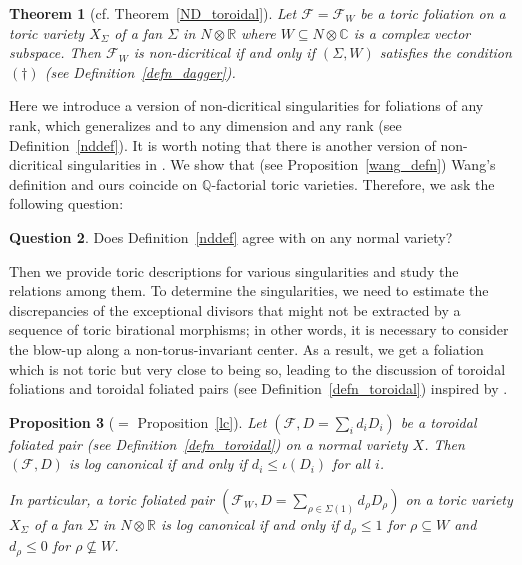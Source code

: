 \documentclass[12pt,reqno]{amsart}
\newtheorem{theorem}{Theorem}[section]
\newtheorem{proposition}[theorem]{Proposition}
\theoremstyle{definition}
\newtheorem{question}[theorem]{Question}
\newcommand{\mb}{\mathbb}
\newcommand\cF{{\mathcal{F}}}
\newcommand\bC{{\mathbb C}}
\newcommand\bR{{\mathbb R}}
\begin{document}
\begin{theorem}[{cf. Theorem~\ref{ND_toroidal}}]
    Let $\cF=\cF_W$ be a toric foliation on a toric variety $X_\Sigma$ of a fan $\Sigma$ in $N\otimes\bR$ where $W\subseteq N\otimes\bC$ is a complex vector subspace. 
    Then $\cF_W$ is non-dicritical if and only if $(\Sigma,W)$ satisfies the condition $(\dagger)$ (see Definition~\ref{defn_dagger}). 
\end{theorem}

Here we introduce a version of non-dicritical singularities for foliations of any rank, which generalizes \cite[Definition 2.10]{CS} and \cite[paragraph before Lemma 2.6]{cascini2025mmp} to any dimension and any rank (see Definition~\ref{nddef}).
It is worth noting that there is another version of non-dicritical singularities in \cite[Definition 3.6]{wang2023toric}. 
We show that (see Proposition~\ref{wang_defn}) Wang's definition and ours coincide on $\mb Q$-factorial toric varieties.
Therefore, we ask the following question:

\begin{question}
    Does Definition~\ref{nddef} agree with \cite[Definition 3.6]{wang2023toric} on any normal variety?
\end{question}

Then we provide toric descriptions for various singularities and study the relations among them.
To determine the singularities, we need to estimate the discrepancies of the exceptional divisors that might not be extracted by a sequence of toric birational morphisms; in other words, 
it is necessary to consider the blow-up along a non-torus-invariant center.
As a result, we get a foliation which is not toric but very close to being so, leading to the discussion of toroidal foliations and toroidal foliated pairs (see Definition~\ref{defn_toroidal}) inspired by 
\cite[Section 3.2]{ambro2021positivity}. 

\begin{proposition}[{$=$ Proposition~\ref{lc}}]
    Let $(\cF,D=\sum_id_iD_i)$ be a toroidal foliated pair (see Definition~\ref{defn_toroidal}) on a normal variety $X$. 
    Then $(\cF,D)$ is log canonical if and only if $d_i\leq\iota(D_i)$ for all $i$. 

    In particular, a toric foliated pair $(\cF_W,D=\sum_{\rho\in\Sigma(1)} d_\rho D_\rho)$ on a toric variety $X_\Sigma$ of a fan $\Sigma$ in $N\otimes\bR$ is log canonical if and only if $d_\rho\leq 1$ for $\rho\subseteq W$ and $d_\rho\leq 0$ for $\rho\nsubseteq W$. 
\end{proposition}
\end{document}

